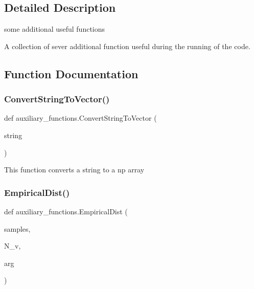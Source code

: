 \subsection{Detailed Description}
some additional useful functions 

A collection of sever additional function useful during the running of the code. 

\subsection{Function Documentation}
\mbox{\label{namespaceauxiliary__functions_a32a6214120a3c44697fa73f31352f2b7}} 
\subsubsection{\texorpdfstring{Convert\+String\+To\+Vector()}{ConvertStringToVector()}}
{\footnotesize\ttfamily def auxiliary\+\_\+functions.\+Convert\+String\+To\+Vector (\begin{DoxyParamCaption}\item[{}]{string }\end{DoxyParamCaption})}

\begin{DoxyVerb}This function converts a string to a np array\end{DoxyVerb}
 \mbox{\label{namespaceauxiliary__functions_a65d08dfca6f21d777715ab4a24ba5e11}} 
\subsubsection{\texorpdfstring{Empirical\+Dist()}{EmpiricalDist()}}
{\footnotesize\ttfamily def auxiliary\+\_\+functions.\+Empirical\+Dist (\begin{DoxyParamCaption}\item[{}]{samples,  }\item[{}]{N\+\_\+v,  }\item[{}]{arg }\end{DoxyParamCaption})}

